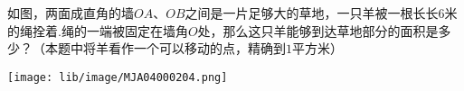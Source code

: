 如图，两面成直角的墙$OA$、$OB$之间是一片足够大的草地，一只羊被一根长长$6$米的绳拴着.绳的一端被固定在墙角$O$处，那么这只羊能够到达草地部分的面积是多少？（本题中将羊看作一个可以移动的点，精确到$1$平方米）

\begin{center}
    \texttt{[image: lib/image/MJA04000204.png]}
\end{center}
